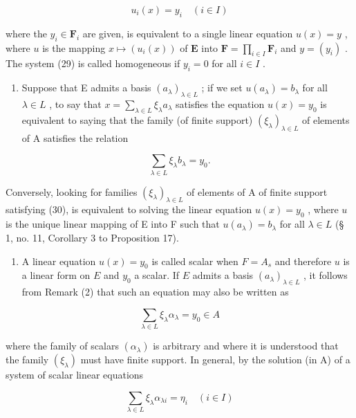\[
u _ {i} (x) = y _ {i} \quad (i \in I)\tag{29}
\]

where the \(y_{i} \in \mathbf{F}_{i}\) are given, is equivalent to a single linear equation \(u(x) = y\) , where \(u\) is the mapping \(x \mapsto (u_{i}(x))\) of \(\mathbf{E}\) into \(\mathbf{F} = \prod_{i \in I} \mathbf{F}_{i}\) and \(y = (y_{i})\) . The system (29) is called homogeneous if \(y_{i} = 0\) for all \(i \in I\) .

\begin{enumerate}
\def\labelenumi{(\arabic{enumi})}
\setcounter{enumi}{1}
\tightlist
\item
  Suppose that E admits a basis \((a_{\lambda})_{\lambda \in L}\) ; if we set \(u(a_{\lambda}) = b_{\lambda}\) for all \(\lambda \in L\) , to say that \(x = \sum_{\lambda \in L} \xi_{\lambda} a_{\lambda}\) satisfies the equation \(u(x) = y_0\) is equivalent to saying that the family (of finite support) \((\xi_{\lambda})_{\lambda \in L}\) of elements of A satisfies the relation
\end{enumerate}

\[
\sum_ {\lambda \in L} \xi_ {\lambda} b _ {\lambda} = y _ {0}.\tag{30}
\]

Conversely, looking for families \((\xi_{\lambda})_{\lambda \in L}\) of elements of A of finite support satisfying (30), is equivalent to solving the linear equation \(u(x) = y_0\) , where \(u\) is the unique linear mapping of E into F such that \(u(a_{\lambda}) = b_{\lambda}\) for all \(\lambda \in L\) (§ 1, no. 11, Corollary 3 to Proposition 17).

\begin{enumerate}
\def\labelenumi{(\arabic{enumi})}
\setcounter{enumi}{2}
\tightlist
\item
  A linear equation \(u(x) = y_0\) is called scalar when \(F = A_s\) and therefore \(u\) is a linear form on \(E\) and \(y_0\) a scalar. If \(E\) admits a basis \((a_\lambda)_{\lambda \in L}\) , it follows from Remark (2) that such an equation may also be written as
\end{enumerate}

\[
\sum_ {\lambda \in L} \xi_ {\lambda} \alpha_ {\lambda} = y _ {0} \in A\tag{31}
\]

where the family of scalars \((\alpha_{\lambda})\) is arbitrary and where it is understood that the family \((\xi_{\lambda})\) must have finite support. In general, by the solution (in A) of a system of scalar linear equations

\[
\sum_ {\lambda \in L} \xi_ {\lambda} \alpha_ {\lambda i} = \eta_ {i} \quad (i \in I)\tag{32}
\]

